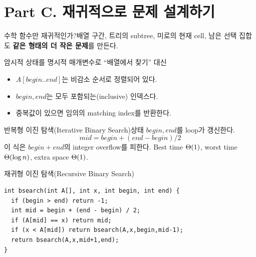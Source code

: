 \section{Part C. 재귀적으로 문제 설계하기}
\begin{frame}{수학 함수만 재귀적인가?}배열 구간, 트리의 subtree, 미로의 현재 cell, 남은 선택 집합도 \textbf{같은 형태의 더 작은 문제}를 만든다.
\end{frame}
\begin{frame}{암시적 상태를 명시적 매개변수로}
“배열에서 찾기” 대신
\begin{itemize}
  \item $A[begin..end]$는 비감소 순서로 정렬되어 있다.
  \item $begin,end$는 모두 포함되는(inclusive) 인덱스다.
  \item 중복값이 있으면 임의의 matching index를 반환한다.
\end{itemize}
\end{frame}
\begin{frame}{반복형 이진 탐색(Iterative Binary Search)}\small 상태 $begin,end$를 loop가 갱신한다.\[mid=begin+(end-begin)/2\]이 식은 $begin+end$의 integer overflow를 피한다. Best time $\Theta(1)$, worst time $\Theta(\log n)$, extra space $\Theta(1)$.
\end{frame}
\begin{frame}[fragile]{재귀형 이진 탐색(Recursive Binary Search)}\begin{lstlisting}
int bsearch(int A[], int x, int begin, int end) {
  if (begin > end) return -1;
  int mid = begin + (end - begin) / 2;
  if (A[mid] == x) return mid;
  if (x < A[mid]) return bsearch(A,x,begin,mid-1);
  return bsearch(A,x,mid+1,end);
}
\end{lstlisting}
\vfill{}
\end{frame}
